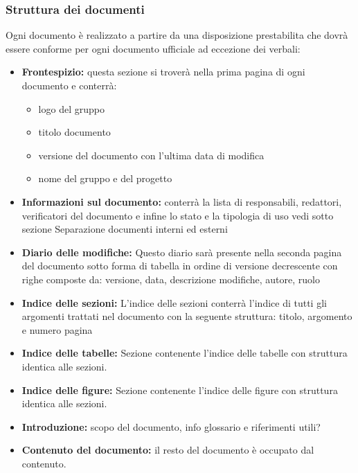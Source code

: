 \documentclass[NormeDiProgetto.tex]{subfiles}
\begin{document}
	\subsubsection{Struttura dei documenti}
		Ogni documento è realizzato a partire da una disposizione prestabilita che dovrà essere conforme per ogni documento ufficiale ad eccezione dei verbali:
		\begin{itemize}
			\item \textbf{Frontespizio:} questa sezione si troverà nella prima pagina di ogni documento e conterrà:
			\begin{itemize}
				\item logo del gruppo
				\item titolo documento
				\item versione del documento con l'ultima data di modifica
				\item nome del gruppo e del progetto
			\end{itemize}
			
			\item \textbf{Informazioni sul documento:} conterrà la lista di responsabili,
			redattori, verificatori del documento e infine lo stato e la tipologia di uso vedi sotto sezione {Separazione documenti interni ed esterni}%
			
			\item \textbf{Diario delle modifiche:}
			Questo diario sarà presente nella seconda pagina del documento sotto forma di tabella in ordine di versione decrescente con righe composte da: versione, data, descrizione modifiche, autore, ruolo
			
			\item \textbf{Indice delle sezioni:}
			L'indice delle sezioni conterrà l'indice di tutti gli argomenti trattati nel documento con la seguente struttura: titolo, argomento e numero pagina
			
			\item \textbf{Indice delle tabelle:} %
			Sezione contenente l'indice delle tabelle con struttura identica alle sezioni. 
			
			\item \textbf{Indice delle figure:} %
			Sezione contenente l'indice delle figure con struttura identica alle sezioni. 
			
			\item \textbf{Introduzione:}
			scopo del documento, info glossario e riferimenti utili?
			 
			\item \textbf{Contenuto del documento:} il resto del documento è occupato dal contenuto.
			
			
		\end{itemize}
		
\end{document}
